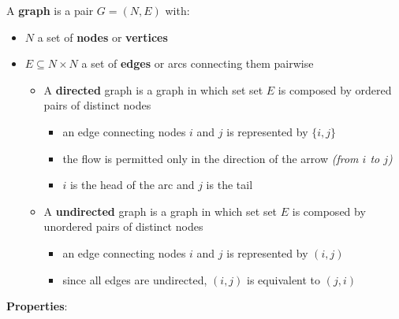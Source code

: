 \documentclass[english]{article}
\begin{document}
A \textbf{graph} is a pair \(G = (N, E)\) with:

\begin{itemize}
  \item \(N\) a set of \textbf{nodes} or \textbf{vertices}
  \item \(E \subseteq N \times N\) a set of \textbf{edges} or arcs connecting them pairwise
        \begin{itemize}
          \item A \textbf{directed} graph is a graph in which set set \(E\) is composed by ordered pairs of distinct nodes
                \begin{itemize}[label=\(\rightarrow\)]
                  \item an edge connecting nodes \(i\) and \(j\) is represented by \(\{i, j\}\)
                  \item the flow is permitted only in the direction of the arrow \textit{(from \(i\) to \(j\))}
                  \item \(i\) is the head of the arc and \(j\) is the tail
                \end{itemize}
          \item A \textbf{undirected} graph is a graph in which set set \(E\) is composed by unordered pairs of distinct nodes
                \begin{itemize}[label=\(\rightarrow\)]
                  \item an edge connecting nodes \(i\) and \(j\) is represented by \((i, j)\)
                  \item since all edges are undirected, \((i, j)\) is equivalent to \((j, i)\)
                \end{itemize}
        \end{itemize}
\end{itemize}

\bigskip
\textbf{Properties}:
\end{document}
